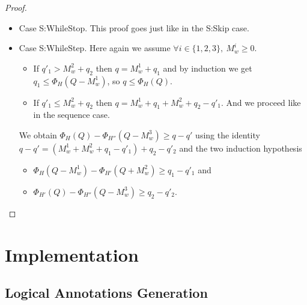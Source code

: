 \documentclass[10pt]{article}
\begin{document}
\begin{proof}
\begin{itemize}
\item Case {\sc S:WhileStop}.
  This proof goes just like in the {\sc S:Skip} case.

\item Case {\sc S:WhileStep}.
  Here again we assume $\forall i \in \{1, 2, 3\},~M_w^i \ge 0$.
  \begin{itemize}[topsep=0pt]
  \item
    If $q'_1 > M_w^2 + q_2$ then $q = M_w^1 + q_1$ and by induction
    we get $q_1 \le \Phi_H(Q - M_w^1)$, so $q \le \Phi_H(Q)$.
  \item
    If $q'_1 \le M_w^2 + q_2$ then $q = M_w^1 + q_1 + M_w^2 + q_2 - q'_1$.
    And we proceed like in the sequence case.
  \end{itemize}
  We obtain $\Phi_H(Q) - \Phi_{H''}(Q - M_w^3) \ge q - q'$ using the identity
  $q - q' = (M_w^1 + M_w^2 + q_1 - q'_1) + q_2 - q'_2$ and the two
  induction hypothesis
  \begin{itemize}[topsep=0pt]
  \item $\Phi_H(Q - M_w^1) - \Phi_{H'}(Q + M_w^2) \ge q_1 - q'_1$ and
  \item $\Phi_{H'}(Q) - \Phi_{H''}(Q - M_w^3) \ge q_2 - q'_2.$
  \end{itemize}

\end{itemize}
\end{proof}

\section{Implementation}

\subsection{Logical Annotations Generation}
\end{document}
